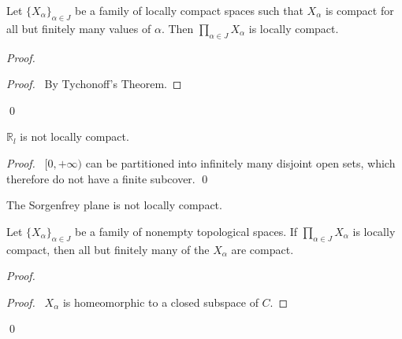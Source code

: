 \begin{prop}
 Let $\{ X_\alpha \}_{\alpha \in J}$ be a family of locally compact spaces
such that $X_\alpha$ is compact for all but finitely many values of $\alpha$.
Then $\prod_{\alpha \in J} X_\alpha$ is locally compact.
\end{prop}

\begin{proof}
\pf
{}
\begin{proof}
  \pf\ By Tychonoff's Theorem.
\end{proof}
\qed
\end{proof}

\begin{prop}
 $\mathbb{R}_l$ is not locally compact.
\end{prop}

\begin{proof}
\pf\ $[0, +\infty)$ can be partitioned into infinitely many disjoint open
sets, which therefore do not have a finite subcover. \qed
\end{proof}

\begin{cor}
The Sorgenfrey plane is not locally compact.
\end{cor}

  \begin{prop}
 Let $\{X_\alpha\}_{\alpha \in J}$ be a family of nonempty topological
spaces. If    $\prod_{\alpha \in J} X_\alpha$ is locally compact, then all but
finitely many of the $X_\alpha$ are compact.
\end{prop}

\begin{proof}
\pf
{}
\begin{proof}
  \pf\ $X_\alpha$ is homeomorphic to a closed subspace of $C$.
\end{proof}
\qed
\end{proof}

